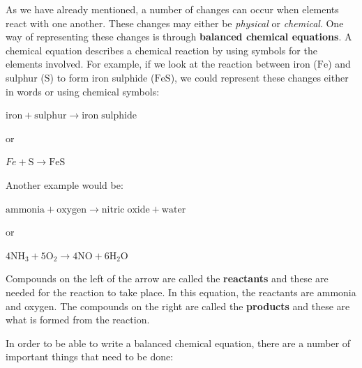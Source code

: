       \label{m38721*id62175}As we have already mentioned, a number of changes can occur when elements react with one another. These changes may either be \textsl{physical} or \textsl{chemical}. One way of representing these changes is through \textbf{balanced chemical equations}. A chemical equation describes a chemical reaction by using symbols for the elements involved. For example, if we look at the reaction between iron (\begin{math}\mathrm{Fe}\end{math}) and sulphur (\begin{math}\mathrm{S}\end{math}) to form iron sulphide (\begin{math}\mathrm{FeS}\end{math}), we could represent these changes either in words or using chemical symbols:\par 
      \label{m38721*id62197}\begin{math}\mathrm{iron}+\mathrm{sulphur}\to \mathrm{iron\; sulphide}\end{math}\par 
      \label{m38721*id62550}or\par 
      \label{m38721*id62555}
        \begin{math}Fe+\mathrm{S}\to \mathrm{FeS}\end{math}
      \par 
      \label{m38721*id62582}Another example would be:\par 
      \label{m38721*id62585}\begin{math}\mathrm{ammonia}+\mathrm{oxygen}\to \mathrm{nitric\; oxide}+\mathrm{water}\end{math}\par 
      \label{m38721*id62598}or\par 
      \label{m38721*id62603}\begin{math}4{\mathrm{NH}}_{3}+5{\mathrm{O}}_{2}\to 4\mathrm{NO}+6{\mathrm{H}}_{2}\mathrm{O}\end{math}
      \par 
      \label{m38721*id62659}Compounds on the left of the arrow are called the \textbf{reactants} and these are needed for the reaction to take place. In this equation, the reactants are ammonia and oxygen. The compounds on the right are called the \textbf{products} and these are what is formed from the reaction.\par 
      \label{m38721*id62675}In order to be able to write a balanced chemical equation, there are a number of important things that need to be done:\par 
